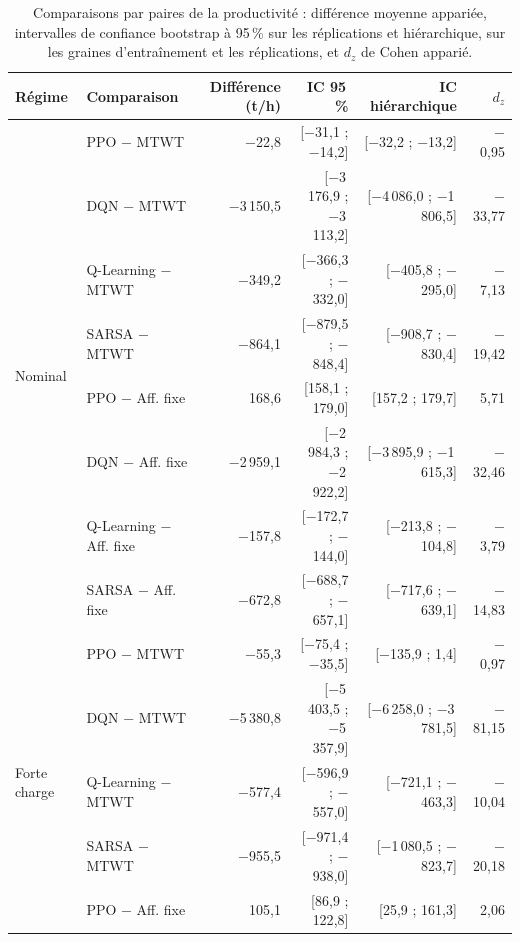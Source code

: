 \documentclass[11pt,a4paper]{article}
\newif\ifrevmarks
\newcommand{\revtag}[1]{\ifrevmarks\textsuperscript{\textcolor{red!70!black}{\scriptsize[#1]}}\fi}
\newenvironment{revbloc}[1]{\par\ifrevmarks\color{revcolor}\noindent\revtag{#1}\ \fi}{\par}
\newif\ifcorrmarks
\newenvironment{corrbloc}{\par\ifcorrmarks\color{corrcolor}\fi}{\par}
\begin{document}
\begin{revbloc}{T31}
\begin{corrbloc}
\begin{table}[H]
\centering
\caption{Comparaisons par paires de la productivité : différence moyenne appariée, intervalles de confiance bootstrap à 95\,\% sur les réplications et hiérarchique, sur les graines d'entraînement et les réplications, et $d_z$ de Cohen apparié.}
\label{tab:stats}
\footnotesize
\setlength{\tabcolsep}{4pt}
\begin{tabular}{@{}llrrrr@{}}
\toprule
\textbf{Régime} & \textbf{Comparaison} & \textbf{Différence (t/h)} & \textbf{IC 95\,\%} & \textbf{IC hiérarchique} & \textbf{$d_z$} \\
\midrule
\multirow{8}{*}{Nominal} & PPO $-$ MTWT & $-$22{,}8 & [$-$31{,}1 ; $-$14{,}2] & [$-$32{,}2 ; $-$13{,}2] & $-$0{,}95 \\
 & DQN $-$ MTWT & $-$3\,150{,}5 & [$-$3\,176{,}9 ; $-$3\,113{,}2] & [$-$4\,086{,}0 ; $-$1\,806{,}5] & $-$33{,}77 \\
 & Q-Learning $-$ MTWT & $-$349{,}2 & [$-$366{,}3 ; $-$332{,}0] & [$-$405{,}8 ; $-$295{,}0] & $-$7{,}13 \\
 & SARSA $-$ MTWT & $-$864{,}1 & [$-$879{,}5 ; $-$848{,}4] & [$-$908{,}7 ; $-$830{,}4] & $-$19{,}42 \\
 & PPO $-$ Aff. fixe & 168{,}6 & [158{,}1 ; 179{,}0] & [157{,}2 ; 179{,}7] & 5{,}71 \\
 & DQN $-$ Aff. fixe & $-$2\,959{,}1 & [$-$2\,984{,}3 ; $-$2\,922{,}2] & [$-$3\,895{,}9 ; $-$1\,615{,}3] & $-$32{,}46 \\
 & Q-Learning $-$ Aff. fixe & $-$157{,}8 & [$-$172{,}7 ; $-$144{,}0] & [$-$213{,}8 ; $-$104{,}8] & $-$3{,}79 \\
 & SARSA $-$ Aff. fixe & $-$672{,}8 & [$-$688{,}7 ; $-$657{,}1] & [$-$717{,}6 ; $-$639{,}1] & $-$14{,}83 \\
\midrule
\multirow{8}{*}{Forte charge} & PPO $-$ MTWT & $-$55{,}3 & [$-$75{,}4 ; $-$35{,}5] & [$-$135{,}9 ; 1{,}4] & $-$0{,}97 \\
 & DQN $-$ MTWT & $-$5\,380{,}8 & [$-$5\,403{,}5 ; $-$5\,357{,}9] & [$-$6\,258{,}0 ; $-$3\,781{,}5] & $-$81{,}15 \\
 & Q-Learning $-$ MTWT & $-$577{,}4 & [$-$596{,}9 ; $-$557{,}0] & [$-$721{,}1 ; $-$463{,}3] & $-$10{,}04 \\
 & SARSA $-$ MTWT & $-$955{,}5 & [$-$971{,}4 ; $-$938{,}0] & [$-$1\,080{,}5 ; $-$823{,}7] & $-$20{,}18 \\
 & PPO $-$ Aff. fixe & 105{,}1 & [86{,}9 ; 122{,}8] & [25{,}9 ; 161{,}3] & 2{,}06 \\

\end{tabular}
\end{table}
\end{corrbloc}
\end{revbloc}
\end{document}
